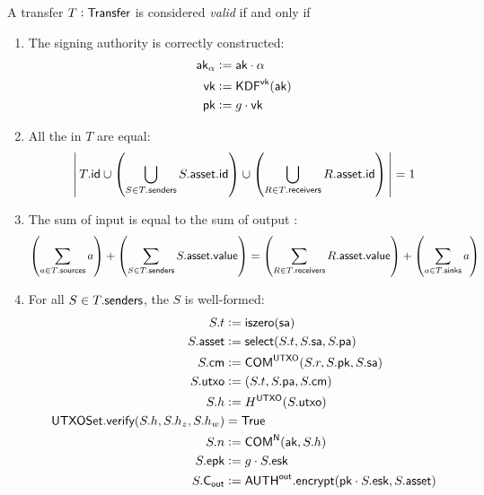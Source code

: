 \begin{definition}\label{def:transfer-validity-statement}
    A transfer $T : {\textsf{Transfer}}$ is considered \emph{valid} if and only if
    \begin{enumerate}
        \item The signing authority is correctly constructed:
            \begin{align*}
                {\textsf{ak}}_\alpha &:= {\textsf{ak}} \cdot \alpha \\
                {\textsf{vk}}        &:= {\textsf{KDF}}^{{\textsf{vk}}}({\textsf{ak}}) \\
                {\textsf{pk}}        &:= g \cdot {\textsf{vk}}
            \end{align*}
        \item All the  in $T$ are equal:
            \[
                \left|\,
                    T.{\textsf{id}}
                    \cup
                    \left(\bigcup_{S \in T.{\textsf{senders}}} S.{\textsf{asset}}.{\textsf{id}} \right)
                    \cup
                    \left(\bigcup_{R \in T.{\textsf{receivers}}} R.{\textsf{asset}}.{\textsf{id}} \right)
                \,\right| = 1
            \]
        \item The sum of input  is equal to the sum of output :
            \[
                \left(\sum_{a \in T.{\textsf{sources}}} a\right)
                +
                \left(\sum_{S \in T.{\textsf{senders}}} S.{\textsf{asset}}.{\textsf{value}}\right)
                =
                \left(\sum_{R \in T.{\textsf{receivers}}} R.{\textsf{asset}}.{\textsf{value}}\right)
                +
                \left(\sum_{a \in T.{\textsf{sinks}}} a\right)
            \]
        \item For all $S \in T.{\textsf{senders}}$, the \Sender{} $S$ is well-formed:
            \begin{align*}
                S.t     &:= {\textsf{iszero}}({\textsf{sa}}) \\
                S.{\textsf{asset}} &:= {\textsf{select}}(S.t, S.{\textsf{sa}}, S.{\textsf{pa}}) \\
                S.{\textsf{cm}}   &:= {\textsf{COM}}^{{\textsf{UTXO}}}(S.r, S.{\textsf{pk}}, S.{\textsf{sa}}) \\
                S.{\textsf{utxo}} &:= (S.t, S.{\textsf{pa}}, S.{\textsf{cm}}) \\
                S.h     &:= H^{{\textsf{UTXO}}}(S.{\textsf{utxo}}) \\
                {\textsf{UTXOSet}}.{\textsf{verify}}(S.h, S.h_z, S.h_w) &= {\textsf{True}} \\
                S.n     &:= {\textsf{COM}}^{\textsf{N}}({\textsf{ak}}, S.h) \\
                S.{\textsf{epk}}  &:= g \cdot S.{\textsf{esk}} \\
                S.{\textsf{C}_\textsf{out}} &:= {{\textsf{AUTH}}^\textsf{out}}.{\textsf{encrypt}}({\textsf{pk}} \cdot S.{\textsf{esk}}, S.{\textsf{asset}})
            \end{align*}

\end{enumerate}
\end{definition}

